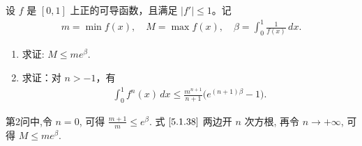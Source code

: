 \documentclass[../../main.tex]{subfiles}
\begin{document}
\begin{example}
设 \( f \) 是 \([0,1]\) 上正的可导函数，且满足 \(|f'| \leqslant 1\)。记  
\begin{align}
m = \min f(x), \quad M = \max f(x), \quad \beta = \int_{0}^{1} \frac{1}{f(x)} \, dx. \label{5.1.37}
\end{align}
\begin{enumerate}
\item 求证: \( M \leqslant m e^{\beta} \).

\item 求证：对 \( n > -1 \)，有  
\begin{align}
\int_{0}^{1} f^n(x) \, dx \leqslant \frac{m^{n + 1}}{n + 1} \big( e^{(n + 1)\beta} - 1 \big). \label{5.1.38}
\end{align}  
\end{enumerate}  
\end{example}
\begin{remark}
第2问中,令 \( n = 0 \), 可得 \( \frac{m + 1}{m} \leqslant e^{\beta} \). 式 \(\eqref{5.1.38}\) 两边开 \( n \) 次方根, 再令 \( n \to +\infty \), 可得 \( M \leqslant m e^{\beta} \).
\end{remark}
\end{document}
